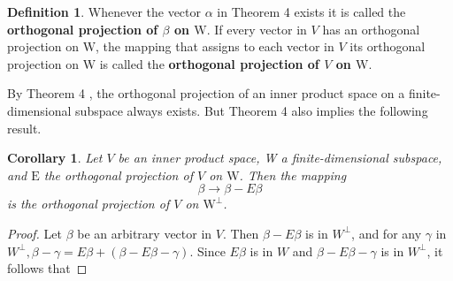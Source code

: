\documentclass{book}
\newtheorem{corollary}{Corollary}[theorem]
\theoremstyle{remark}
\theoremstyle{definition}
\newtheorem{definition}{Definition}[section]
\begin{document}
\begin{definition}Whenever the vector $\alpha$ in Theorem 4 exists it is called the \textbf{orthogonal projection of $\beta$ on $\mathrm{W}$}. If every vector in $V$ has an orthogonal projection on $\mathrm{W}$, the mapping that assigns to each vector in $V$ its orthogonal projection on $\mathrm{W}$ is called the \textbf{orthogonal projection of $V$ on $\mathrm{W}$}.\end{definition}

By Theorem 4 , the orthogonal projection of an inner product space on a finite-dimensional subspace always exists. But Theorem 4 also implies the following result.

\begin{corollary}
    Let $V$ be an inner product space, W a finite-dimensional subspace, and $\mathrm{E}$ the orthogonal projection of $V$ on $\mathrm{W}$. Then the mapping
    $$
    \beta \rightarrow \beta-E \beta
    $$
    is the orthogonal projection of $V$ on $\mathrm{W}^{\perp}$.
\end{corollary}
\begin{proof}
    Let $\beta$ be an arbitrary vector in $V$. Then $\beta-E \beta$ is in $W^{\perp}$, and for any $\gamma$ in $W^{\perp}, \beta-\gamma=E \beta+(\beta-E \beta-\gamma)$. Since $E \beta$ is in $W$ and $\beta-E \beta-\gamma$ is in $W^{\perp}$, it follows that
\end{proof}
\end{document}
